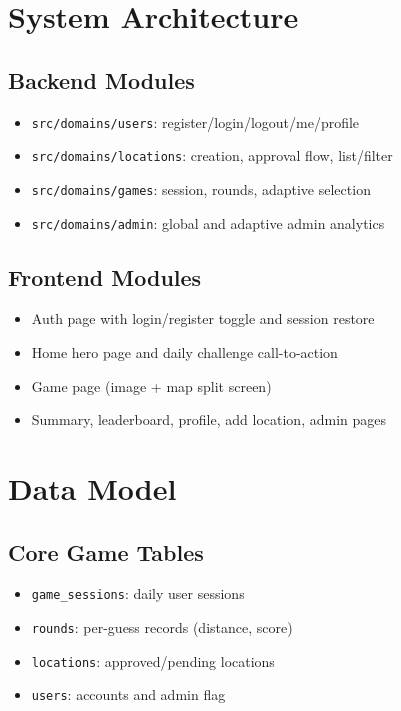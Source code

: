 \documentclass[12pt,a4paper]{article}
\begin{document}
\section{System Architecture}
\subsection{Backend Modules}
\begin{itemize}[noitemsep]
  \item \texttt{src/domains/users}: register/login/logout/me/profile
  \item \texttt{src/domains/locations}: creation, approval flow, list/filter
  \item \texttt{src/domains/games}: session, rounds, adaptive selection
  \item \texttt{src/domains/admin}: global and adaptive admin analytics
\end{itemize}

\subsection{Frontend Modules}
\begin{itemize}[noitemsep]
  \item Auth page with login/register toggle and session restore
  \item Home hero page and daily challenge call-to-action
  \item Game page (image + map split screen)
  \item Summary, leaderboard, profile, add location, admin pages
\end{itemize}

\section{Data Model}
\subsection{Core Game Tables}
\begin{itemize}[noitemsep]
  \item \texttt{game\_sessions}: daily user sessions
  \item \texttt{rounds}: per-guess records (distance, score)
  \item \texttt{locations}: approved/pending locations
  \item \texttt{users}: accounts and admin flag
\end{itemize}
\end{document}

